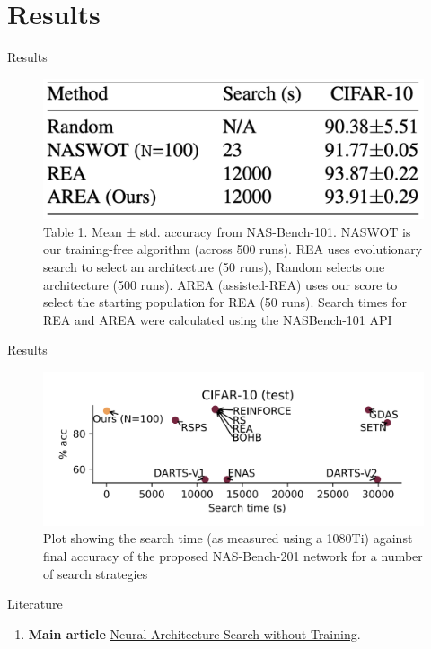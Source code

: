 \documentclass{beamer}
\begin{document}
\section{Results}
\begin{frame}{Results}
    \begin{figure}{}
        \centering
        \includegraphics[scale=0.45]{images/table_small.png}
        \caption{Table 1. Mean ± std. accuracy from NAS-Bench-101. NASWOT is our training-free algorithm (across 500 runs). REA uses evolutionary search to select an architecture (50 runs), Random selects one architecture (500 runs). AREA (assisted-REA) uses our score to select the starting population for REA (50 runs). Search times for REA and AREA were calculated using the NASBench-101 API}
        \label{fig:enter-label}
    \end{figure}
\end{frame}

\begin{frame}{Results}
    \begin{block}{}
        \begin{figure}{}
            \centering
            \includegraphics[scale=0.48]{images/figure7.png}
            \caption{Plot showing the search time (as measured using a 1080Ti) against final accuracy of the proposed NAS-Bench-201 network for a number of search strategies}
            \label{fig:enter-label}
        \end{figure}
    \end{block}
\end{frame}

\begin{frame}{Literature}
    \begin{enumerate}
        \item \textbf{Main article} \href{https://arxiv.org/pdf/2006.04647v3.pdf} 
        {Neural Architecture Search without Training}.
    \end{enumerate}
\end{frame}
\end{document}
